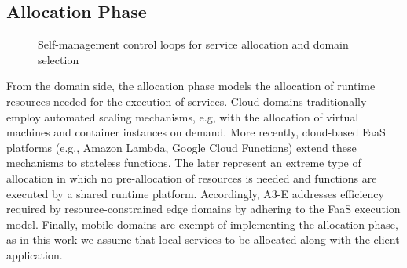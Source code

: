 \subsection{Allocation Phase}\label{sec:A3-E-allocation}

\begin{figure}[thbp]
	\centering
	\captionsetup[subfigure]{width=0.4\textwidth}	
	\null\hfill
	\captionsetup[subfigure]{width=0.4\textwidth}	
	\hfill
	\hfill\null
	\caption{Self-management control loops for service allocation and domain selection}\label{fig:allocation-loops}
\end{figure}

From the domain side, the allocation phase models the allocation of runtime resources needed for the execution of services. Cloud domains traditionally employ automated scaling mechanisms, e.g, with the allocation of virtual machines and container instances on demand. More recently, cloud-based FaaS platforms (e.g., Amazon Lambda, Google Cloud Functions) extend these mechanisms to stateless functions. The later represent an extreme type of allocation in which no pre-allocation of resources is needed and functions are executed by a shared runtime platform. Accordingly, A3-E addresses efficiency required by resource-constrained edge domains by adhering to the FaaS execution model.
Finally, mobile domains are exempt of implementing the allocation phase, as in this work we assume that local services to be allocated along with the client application.

